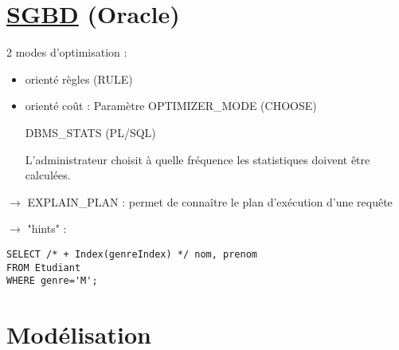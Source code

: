 \documentclass{article}
\begin{document}
\section*{\underline{SGBD} (Oracle)}

2 modes d'optimisation : 
\begin{itemize}\renewcommand{\labelitemi}{$\bullet$}
	\item orienté règles (RULE)
	\item orienté coût : Paramètre OPTIMIZER\_MODE (CHOOSE)

DBMS\_STATS (PL/SQL)

L'administrateur choisit à quelle fréquence les statistiques doivent être calculées.
\end{itemize}

$\rightarrow$ EXPLAIN\_PLAN : permet de connaître le plan d'exécution d'une requête 

$\rightarrow$ "hints" : 

\lstset{language=SQL, frame=none, numbers=none}
\begin{lstlisting}
SELECT /* + Index(genreIndex) */ nom, prenom
FROM Etudiant
WHERE genre='M';
\end{lstlisting}

\section*{Modélisation}
\end{document}
